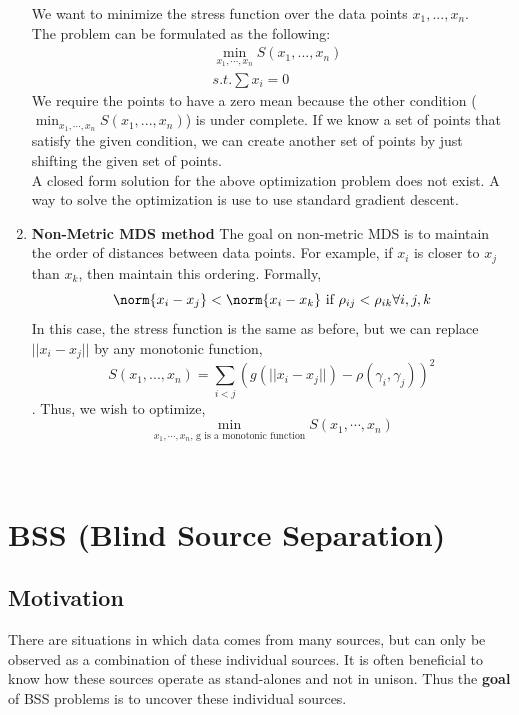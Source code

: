 \begin{enumerate}
\[\]
We want to minimize the stress function over the data points $x_1,...,x_n$.\\
The problem can be formulated as the following:\\
\begin{align*}
&\min_{x_1 ,\cdots,x_n} S(x_1,...,x_n)\\
&s.t. \sum x_i = 0
\end{align*}
We require the points to have a zero mean because the other condition ($\min_{x_1 ,\cdots,x_n} S(x_1,...,x_n)$) is under complete. If we know a set of points that satisfy the given condition, we can create another set of points by just shifting the given set of points.\\
A closed form solution for the above optimization problem does not exist. A way to solve the optimization is use to use standard gradient descent.\\ 
\item \textbf{Non-Metric MDS method} The goal on non-metric MDS is to maintain the order of distances
between data points. For example, if $x_{i}$ is closer to $x_{j}$ than
$x_{k}$, then maintain this ordering. Formally,
$$\norm{x_i - x_j} < \norm{x_i - x_k} \text{ if } \rho_{ij}< \rho_{ik} \forall i,j, k$$
In this case, the stress function is the same as before, but we can replace $||x_{i} - x_{j}||$ by any monotonic function,
$$S(x_1,...,x_n) = \sum_{i<j}(g(||x_i-x_j||)-\rho(\gamma_i, \gamma_j))^2$$. 
Thus, we wish to optimize, 
$$\min_{x_1,\cdots, x_n \text{, g is a monotonic function}} S(x_1,\cdots, x_n)$$
\end{enumerate}



\noindent   \\




\section{BSS (Blind Source Separation) } 

\subsection{Motivation}
There are situations in which data comes from many sources, but can only be observed as a combination of these individual sources. It is often beneficial to know how these sources operate as stand-alones and not in unison. Thus the \textbf{goal} of BSS problems is to uncover these individual sources. 

